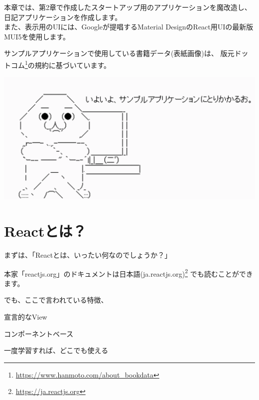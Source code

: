 \begin{starterabstract}
  本章では、第2章で作成したスタートアップ用のアプリケーションを魔改造し、日記アプリケーションを作成します。\\[0pt]

  また、表示用のUIには、Googleが提唱するMaterial DesignのReact用UIの最新版MUI5を使用します。
\end{starterabstract}

サンプルアプリケーションで使用している書籍データ(表紙画像)は、
版元ドットコム\footnote{\url{https://www.hanmoto.com/about_bookdata}}の規約に基づいています。

\begin{reviewimage}[H]%
\includegraphics[width=0.7\maxwidth]{./images/03-todo-with-react/y-sample.png}%
\label{image:03-todo-with-react:y-sample}
\end{reviewimage}

\clearpage


\section{Reactとは？}
\keeplastskip{
  \label{sec:3-1}
  \label{sec-031React}
  \par\nobreak
}

まずは、「Reactとは、いったい何なのでしょうか？」

\vspace*{\baselineskip}

本家「reactjs.org」のドキュメントは日本語(ja.reactjs.org)\footnote{\url{https://ja.reactjs.org}}
でも読むことができます。

でも、ここで言われている特徴、

\begin{starteritemize}
\item 宣言的なView
\item コンポーネントベース
\item 一度学習すれば、どこでも使える
\end{starteritemize}


